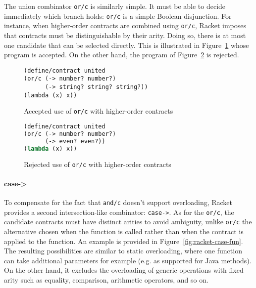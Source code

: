 \documentclass[sigplan,screen,10pt]{acmart}
\newcommand{\unsure}[2][1=]{}
\newcommand{\racket}[1]{\lstinline[language=racket]{#1}}
\begin{document}
The union combinator \racket{or/c} is similarly simple. It must be
able to decide immediately which branch holds: \racket{or/c} is a
simple Boolean disjunction. For instance, when higher-order contracts are combined using \racket{or/c}, Racket imposes
that contracts must be distinguishable by their arity. Doing so, there is at most
one candidate that can be selected directly. This is illustrated in
Figure~\ref{code:racket:or/c:working} whose program is accepted. On the other
hand, the program of Figure~\ref{code:racket:or/c:non-working} is rejected.

\begin{figure}[h]

\begin{lstlisting}[language=racket]
(define/contract united
(or/c (-> number? number?)
      (-> string? string? string?))
(lambda (x) x))
\end{lstlisting}
\caption{Accepted use of \racket{or/c} with higher-order contracts}
\label{code:racket:or/c:working}

\end{figure}

\begin{figure}[h]

\begin{lstlisting}[language=lisp]
(define/contract united
(or/c (-> number? number?)
      (-> even? even?))
(lambda (x) x))
\end{lstlisting}
\caption{Rejected use of \racket{or/c} with higher-order contracts}
\label{code:racket:or/c:non-working}

\end{figure}


\unsure{This section is overall a bit hard to follow. I
  think I've figured out what it means, but it needs more love. Also
  give an example which doesn't work and one that does for or/c.}

\paragraph{case->}

To compensate for the fact that \racket{and/c} doesn't support
overloading,
Racket provides a second intersection-like combinator: \racket{case->}. As for the \racket{or/c}, the candidate contracts must have
distinct arities to avoid ambiguity, unlike \racket{or/c} the
alternative chosen when the function is called rather than when the
contract is applied to the function. An example is provided in
Figure~\ref{fig:racket-case-fun}. The resulting possibilities are similar
to static overloading, where one function can take additional parameters for
example (e.g. as supported for Java methods). On the other hand, it excludes the
overloading of generic operations with fixed arity such as equality, comparison,
arithmetic operators, and so on.
\end{document}
